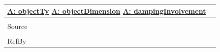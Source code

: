 \documentclass[12pt]{article}
\begin{document}
\begin{minipage}{\textwidth}
\begin{tabular}{p{} p{}}
                                                          \hyperref[assumpOT]{A: objectTy}
                                                          \hyperref[assumpOD]{A: objectDimension}
                                                          \hyperref[assumpDI]{A: dampingInvolvement}
                                                          \\ \midrule \\
                                                          Source & \\ \midrule \\
                                                                   RefBy & 
\\ \bottomrule \end{tabular}
\end{minipage}
\par~
\end{document}
